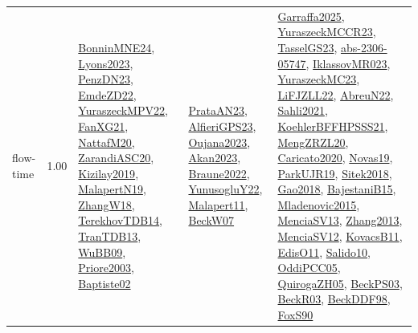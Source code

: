 {\begin{longtable}{p{3cm}r>{\raggedright\arraybackslash}p{6cm}>{\raggedright\arraybackslash}p{6cm}>{\raggedright\arraybackslash}p{8cm}}
\index{flow-time}\index{Concepts!flow-time}flow-time &  1.00 & \hyperref[detail:BonninMNE24]{BonninMNE24}, \hyperref[detail:Lyons2023]{Lyons2023}, \hyperref[detail:PenzDN23]{PenzDN23}, \hyperref[detail:EmdeZD22]{EmdeZD22}, \hyperref[detail:YuraszeckMPV22]{YuraszeckMPV22}, \hyperref[detail:FanXG21]{FanXG21}, \hyperref[detail:NattafM20]{NattafM20}, \hyperref[detail:ZarandiASC20]{ZarandiASC20}, \hyperref[detail:Kizilay2019]{Kizilay2019}, \hyperref[detail:MalapertN19]{MalapertN19}, \hyperref[detail:ZhangW18]{ZhangW18}, \hyperref[detail:TerekhovTDB14]{TerekhovTDB14}, \hyperref[detail:TranTDB13]{TranTDB13}, \hyperref[detail:WuBB09]{WuBB09}, \hyperref[detail:Priore2003]{Priore2003}, \hyperref[detail:Baptiste02]{Baptiste02} & \hyperref[detail:PrataAN23]{PrataAN23}, \hyperref[detail:AlfieriGPS23]{AlfieriGPS23}, \hyperref[detail:Oujana2023]{Oujana2023}, \hyperref[detail:Akan2023]{Akan2023}, \hyperref[detail:Braune2022]{Braune2022}, \hyperref[detail:YunusogluY22]{YunusogluY22}, \hyperref[detail:Malapert11]{Malapert11}, \hyperref[detail:BeckW07]{BeckW07} & \hyperref[detail:Garraffa2025]{Garraffa2025}, \hyperref[detail:YuraszeckMCCR23]{YuraszeckMCCR23}, \hyperref[detail:TasselGS23]{TasselGS23}, \hyperref[detail:abs-2306-05747]{abs-2306-05747}, \hyperref[detail:IklassovMR023]{IklassovMR023}, \hyperref[detail:YuraszeckMC23]{YuraszeckMC23}, \hyperref[detail:LiFJZLL22]{LiFJZLL22}, \hyperref[detail:AbreuN22]{AbreuN22}, \hyperref[detail:Sahli2021]{Sahli2021}, \hyperref[detail:KoehlerBFFHPSSS21]{KoehlerBFFHPSSS21}, \hyperref[detail:MengZRZL20]{MengZRZL20}, \hyperref[detail:Caricato2020]{Caricato2020}, \hyperref[detail:Novas19]{Novas19}, \hyperref[detail:ParkUJR19]{ParkUJR19}, \hyperref[detail:Sitek2018]{Sitek2018}, \hyperref[detail:Gao2018]{Gao2018}, \hyperref[detail:BajestaniB15]{BajestaniB15}, \hyperref[detail:Mladenovic2015]{Mladenovic2015}, \hyperref[detail:MenciaSV13]{MenciaSV13}, \hyperref[detail:Zhang2013]{Zhang2013}, \hyperref[detail:MenciaSV12]{MenciaSV12}, \hyperref[detail:KovacsB11]{KovacsB11}, \hyperref[detail:EdisO11]{EdisO11}, \hyperref[detail:Salido10]{Salido10}, \hyperref[detail:OddiPCC05]{OddiPCC05}, \hyperref[detail:QuirogaZH05]{QuirogaZH05}, \hyperref[detail:BeckPS03]{BeckPS03}, \hyperref[detail:BeckR03]{BeckR03}, \hyperref[detail:BeckDDF98]{BeckDDF98}, \hyperref[detail:FoxS90]{FoxS90}\\

\end{longtable}}
